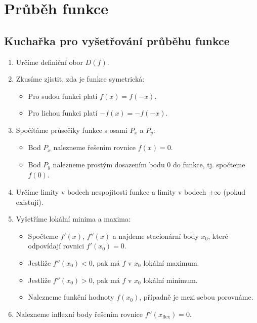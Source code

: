 \section{Průběh funkce}

\subsection{Kuchařka pro vyšetřování průběhu funkce}

\begin{enumerate}

    \item Určíme definiční obor $D(f)$.
    
    \item Zkusíme zjistit, zda je funkce symetrická:
    \begin{itemize}
        \item Pro sudou funkci platí $f(x) = f(-x)$.
        \item Pro lichou funkci platí $-f(x) = - f(-x)$.
    \end{itemize}

    \item Spočítáme průsečíky funkce s osami $P_x$ a $P_y$:
    \begin{itemize}
        \item Bod $P_x$ nalezneme řešením rovnice
        $f(x)=0$.
        \item Bod $P_y$ nalezneme prostým dosazením bodu $0$ do funkce, tj. spočteme $f(0)$.
    \end{itemize}
     
    \item Určíme limity v bodech nespojitosti funkce a limity v bodech $\pm \infty$ (pokud existují).

    \item Vyšetříme lokální minima a maxima:
    \begin{itemize}
        \item Spočteme $f'(x)$, $f''(x)$ a najdeme stacionární body $x_0$, které odpovídají rovnici $f'(x_0) = 0$.
        \item Jestliže $f''(x_0) < 0$, pak má $f$ v $x_0$ lokální maximum.
        \item Jestliže $f''(x_0) > 0$, pak má $f$ v $x_0$ lokální minimum.
        \item Nalezneme funkční hodnoty $f(x_0)$, případně je mezi sebou porovnáme.
    \end{itemize}
    
    \item Nalezneme inflexní body řešením rovnice $f''(x_{\text{flex}}) = 0$.
    

\end{enumerate}
